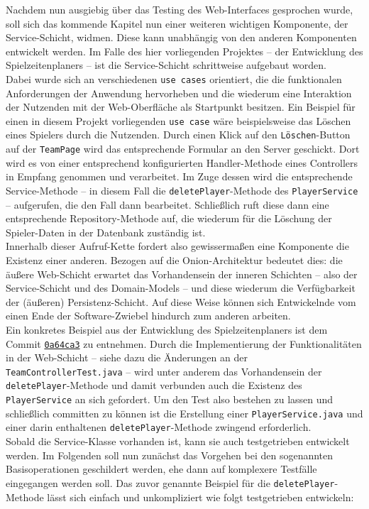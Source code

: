 
Nachdem nun ausgiebig über das Testing des Web-Interfaces gesprochen wurde, soll 
sich das kommende Kapitel nun einer weiteren wichtigen Komponente, der 
Service-Schicht, widmen. Diese kann unabhängig von den anderen Komponenten entwickelt 
werden. Im Falle des hier vorliegenden Projektes -- der Entwicklung des 
Spielzeitenplaners -- ist die Service-Schicht schrittweise aufgebaut worden. \\ 
Dabei wurde sich an verschiedenen \texttt{use cases} orientiert, die die 
funktionalen Anforderungen der Anwendung hervorheben und die wiederum eine 
Interaktion der Nutzenden mit der Web-Oberfläche als Startpunkt besitzen. Ein 
Beispiel für einen in diesem Projekt vorliegenden \texttt{use case} wäre 
beispielsweise das Löschen eines Spielers durch die Nutzenden. Durch einen Klick 
auf den \texttt{Löschen}-Button auf der \texttt{TeamPage} wird das entsprechende 
Formular an den Server geschickt. Dort wird es von einer entsprechend 
konfigurierten Handler-Methode eines Controllers in Empfang genommen und 
verarbeitet. Im Zuge dessen wird die entsprechende Service-Methode -- in diesem 
Fall die \texttt{deletePlayer}-Methode des \texttt{PlayerService} -- aufgerufen, 
die den Fall dann bearbeitet. Schließlich ruft diese dann eine entsprechende 
Repository-Methode auf, die wiederum für die Löschung der Spieler-Daten in der 
Datenbank zuständig ist. \\ 
Innerhalb dieser Aufruf-Kette fordert also gewissermaßen eine Komponente die 
Existenz einer anderen. Bezogen auf die Onion-Architektur bedeutet dies: die äußere 
Web-Schicht erwartet das Vorhandensein der inneren Schichten -- also der 
Service-Schicht und des Domain-Models -- und diese wiederum die Verfügbarkeit der 
(äußeren) Persistenz-Schicht. Auf diese Weise können sich Entwickelnde vom einen 
Ende der Software-Zwiebel hindurch zum anderen arbeiten. \\ 
Ein konkretes Beispiel aus der Entwicklung des Spielzeitenplaners ist dem Commit 
\href{https://github.com/FlorianOhmes/bat_spielzeitenplaner/commit/0a64ca3359402c06358b43cc41236ca24c2ec9cd#diff-c21f1f59588419db3d2efda09d4e20682f83653b4ef81ca9847d7458bc5b2f5f}{\texttt{0a64ca3}}
zu entnehmen. Durch die Implementierung der Funktionalitäten in der Web-Schicht -- 
siehe dazu die Änderungen an der \texttt{TeamControllerTest.java} -- wird unter 
anderem das Vorhandensein der \texttt{deletePlayer}-Methode und damit verbunden auch 
die Existenz des \texttt{PlayerService} an sich gefordert. Um den Test also bestehen 
zu lassen und schließlich committen zu können ist die Erstellung einer 
\texttt{PlayerService.java} und einer darin enthaltenen \texttt{deletePlayer}-Methode 
zwingend erforderlich. \\ 
Sobald die Service-Klasse vorhanden ist, kann sie auch testgetrieben entwickelt 
werden. Im Folgenden soll nun zunächst das Vorgehen bei den sogenannten 
Basisoperationen geschildert werden, ehe dann auf komplexere Testfälle eingegangen 
werden soll. Das zuvor genannte Beispiel für die \texttt{deletePlayer}-Methode lässt 
sich einfach und unkompliziert wie folgt testgetrieben entwickeln: 

